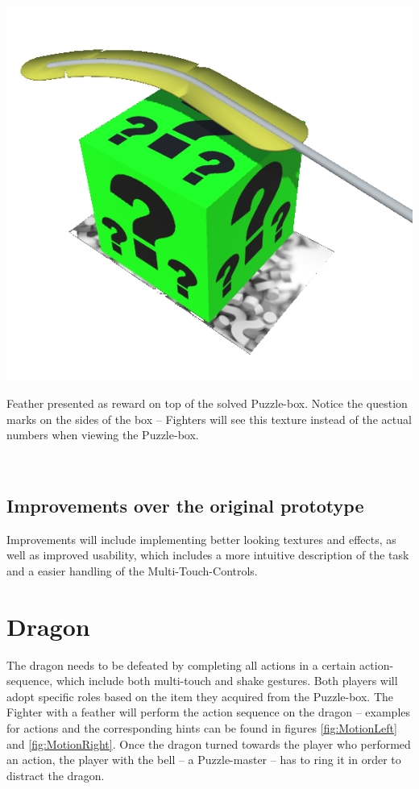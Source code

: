\documentclass{sigchi-ext}
\begin{document}
\begin{marginfigure}[-20pc]
	\begin{minipage}{\marginparwidth}
		\centering
		\includegraphics[width=1\marginparwidth]{figures/PM_SolvedPuzzlebox}
		\caption{Feather presented as reward on top of the solved Puzzle-box. Notice the question marks on the sides of the box -- Fighters will see this texture instead of the actual numbers when viewing the Puzzle-box.}~\label{fig:PM_SolvedPuzzlebox}
	\end{minipage}
\end{marginfigure}

\subsection{Improvements over the original prototype}

Improvements will include implementing better looking textures and effects, as well as improved usability, which includes a more intuitive description of the task and a easier handling of the Multi-Touch-Controls.

\section{Dragon}

The dragon needs to be defeated by completing all actions in a certain action-sequence, which include both multi-touch and shake gestures. Both players will adopt specific roles based on the item they acquired from the Puzzle-box. The Fighter with a feather will perform the action sequence on the dragon -- examples for actions and the corresponding hints can be found in figures \ref{fig:MotionLeft} and \ref{fig:MotionRight}. Once the dragon turned towards the player who performed an action, the player with the bell -- a Puzzle-master -- has to ring it in order to distract the dragon.
\end{document}
